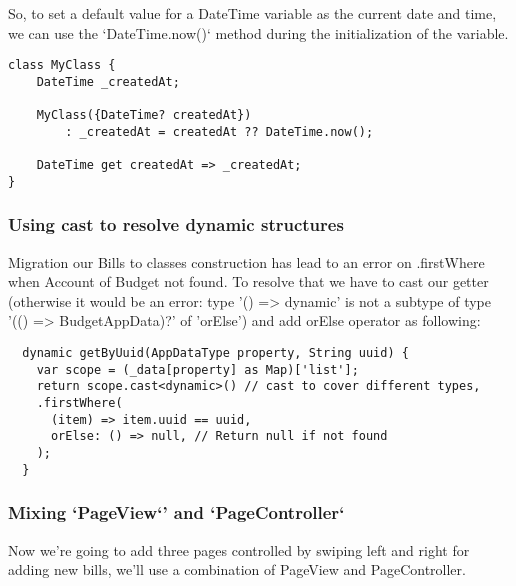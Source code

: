 So, to set a default value for a DateTime variable as the current date and time, we can use the `DateTime.now()` method 
during the initialization of the variable.

\begin{lstlisting}
class MyClass {
    DateTime _createdAt;

    MyClass({DateTime? createdAt})
        : _createdAt = createdAt ?? DateTime.now();

    DateTime get createdAt => _createdAt;
}
\end{lstlisting}


\subsubsection{Using cast to resolve dynamic structures}

Migration our Bills to classes construction has lead to an error on .firstWhere when Account of Budget not found. 
To resolve that we have to cast our getter (otherwise it would be an error: type '() => dynamic' is not a subtype 
of type '(() => BudgetAppData)?' of 'orElse') and add orElse operator as following:

\begin{lstlisting}
  dynamic getByUuid(AppDataType property, String uuid) {
    var scope = (_data[property] as Map)['list'];
    return scope.cast<dynamic>() // cast to cover different types, 
    .firstWhere(
      (item) => item.uuid == uuid,
      orElse: () => null, // Return null if not found
    );
  }
\end{lstlisting}


\subsubsection{Mixing `PageView`' and `PageController`}

Now we're going to add three pages controlled by swiping left and right for adding new bills, we'll use a combination 
of PageView and PageController. 

